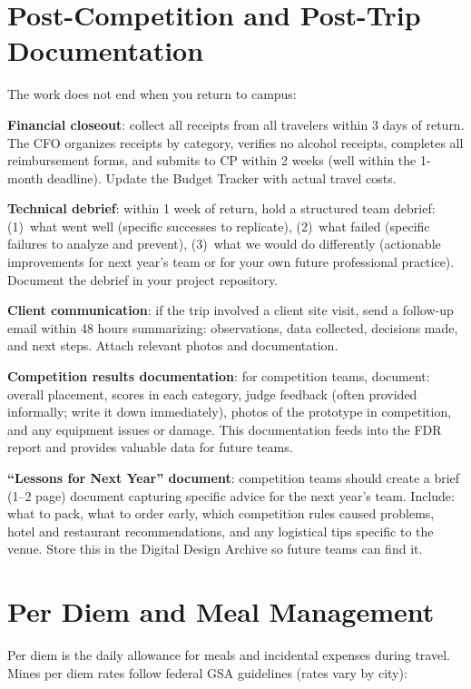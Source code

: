 \section{Post-Competition and Post-Trip Documentation}
The work does not end when you return to campus:

\textbf{Financial closeout}: collect all receipts from all travelers within 3 days of return. The CFO organizes receipts by category, verifies no alcohol receipts, completes all reimbursement forms, and submits to CP within 2 weeks (well within the 1-month deadline). Update the Budget Tracker with actual travel costs.

\textbf{Technical debrief}: within 1 week of return, hold a structured team debrief: (1)~what went well (specific successes to replicate), (2)~what failed (specific failures to analyze and prevent), (3)~what we would do differently (actionable improvements for next year's team or for your own future professional practice). Document the debrief in your project repository.

\textbf{Client communication}: if the trip involved a client site visit, send a follow-up email within 48 hours summarizing: observations, data collected, decisions made, and next steps. Attach relevant photos and documentation.

\textbf{Competition results documentation}: for competition teams, document: overall placement, scores in each category, judge feedback (often provided informally; write it down immediately), photos of the prototype in competition, and any equipment issues or damage. This documentation feeds into the FDR report and provides valuable data for future teams.

\textbf{``Lessons for Next Year'' document}: competition teams should create a brief (1--2 page) document capturing specific advice for the next year's team. Include: what to pack, what to order early, which competition rules caused problems, hotel and restaurant recommendations, and any logistical tips specific to the venue. Store this in the Digital Design Archive so future teams can find it.



\section{Per Diem and Meal Management}
Per diem is the daily allowance for meals and incidental expenses during travel. Mines per diem rates follow federal GSA guidelines (rates vary by city):


